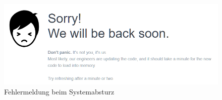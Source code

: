 \begin{figure}[H]
  \centering
  \includegraphics[width=\textwidth]{Bilder/Fehlermeldung.PNG}
  \caption{Fehlermeldung beim Systemabsturz}
  \label{fig:fehlMeldung}
\end{figure}

